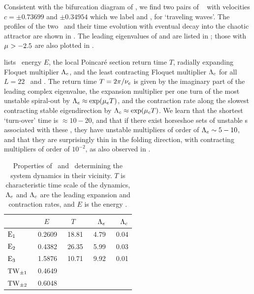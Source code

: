 Consistent with the bifurcation diagram of ,
we find two pairs of \reqva\  with velocities 
$c =\pm 0.73699$ and $\pm 0.34954$
which we label  and ,
for `traveling waves'.
The profiles of the two \reqva\ and their time evolution
with eventual decay into the chaotic attractor are
shown in .  The leading eigenvalues of
 and  are listed in ;
those with $\eigRe > -2.5$ are also plotted in
.

 lists \eqv\ energy $E$,
the local Poincar\'e section return time $T$,
radially expanding Floquet multiplier $\ExpaEig_e$, and
the least contracting Floquet multiplier $\ExpaEig_c$
for all $L=22$ \eqva\ and \reqva.
The return time $T=2\pi/\eigIm[e]$ is given by the imaginary
part of the leading complex eigenvalue,
the expansion
multiplier per one turn of the most unstable spiral-out by
$\ExpaEig_e\approx\exp(\eigRe[e] T)$, and the contraction
rate along the slowest contracting stable eigendirection by
$\ExpaEig_c\approx\exp(\eigRe[c]T)$. We learn that the shortest
`turn-over' time is $\approx 10-20$, and that if there exist
horseshoe sets of unstable \po s associated with
these \eqva,  they have unstable
multipliers of order of $\ExpaEig_e \sim 5-10$, and that
they are surprisingly thin in the folding direction, with
contracting multipliers of order of $10^{-2}$,
as also observed in .

\begin{table}[ht]
    \caption{
    Properties of \eqva\ and \reqva\ determining
    the system dynamics in their vicinity.  $T$ is characteristic
    time scale of the dynamics, $\ExpaEig_e$ and $\ExpaEig_c$ are the
    leading expansion and contraction rates, and $E$ is the
    energy .
            }
\begin{center} \footnotesize
    \begin{tabular}{l|rrrr}
                 & $E$~~   & $T$~~  & $\ExpaEig_e$  & $\ExpaEig_c$  \\ \hline
 $\EQV{1}\ $     &\ 0.2609 &\ 18.81 &\ 4.79     &\ 0.04 \\
 $\EQV{2}\ $     &\ 0.4382 &\ 26.35 &\ 5.99     &\ 0.03 \\
 $\EQV{3}\ $     &\ 1.5876 &\ 10.71 &\ 9.92     &\ 0.01 \\
 $\REQV{\pm}{1}$ &\ 0.4649 &  &  & \\
 $\REQV{\pm}{2}$ &\ 0.6048 &  &  & \\
    \end{tabular}
\end{center}
\label{tab:L22cminus}
\end{table}

